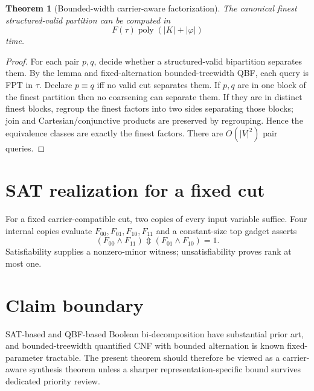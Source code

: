 \documentclass[11pt]{article}
\newtheorem{theorem}{Theorem}
\newcommand{\xor}{\mathbin{\Updownarrow}}
\begin{document}
\begin{theorem}[Bounded-width carrier-aware factorization]
The canonical finest structured-valid partition can be computed in
\[
F(\tau)\operatorname{poly}(|K|+|\varphi|)
\]
time.
\end{theorem}
\begin{proof}
For each pair $p,q$, decide whether a structured-valid bipartition separates them. By the lemma and fixed-alternation bounded-treewidth QBF, each query is FPT in $\tau$. Declare $p\equiv q$ iff no valid cut separates them. If $p,q$ are in one block of the finest partition then no coarsening can separate them. If they are in distinct finest blocks, regroup the finest factors into two sides separating those blocks; join and Cartesian/conjunctive products are preserved by regrouping. Hence the equivalence classes are exactly the finest factors. There are $O(|V|^2)$ pair queries.
\end{proof}

\section{SAT realization for a fixed cut}
For a fixed carrier-compatible cut, two copies of every input variable suffice. Four internal copies evaluate $F_{00},F_{01},F_{10},F_{11}$ and a constant-size top gadget asserts
\[
(F_{00}\wedge F_{11})\xor(F_{01}\wedge F_{10})=1.
\]
Satisfiability supplies a nonzero-minor witness; unsatisfiability proves rank at most one.

\section{Claim boundary}
SAT-based and QBF-based Boolean bi-decomposition have substantial prior art, and bounded-treewidth quantified CNF with bounded alternation is known fixed-parameter tractable. The present theorem should therefore be viewed as a carrier-aware synthesis theorem unless a sharper representation-specific bound survives dedicated priority review.
\end{document}
